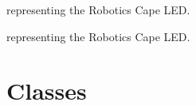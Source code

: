 \documentclass[letterpaper,10pt,english]{sphinxmanual}
\begin{document}

\begin{fulllineitems}
\label{\detokenize{index:rcpy.led.red}}
{\hyperref[\detokenize{index:rcpy.led.LED}]{}} representing the Robotics Cape  LED.

\end{fulllineitems}


\begin{fulllineitems}
\label{\detokenize{index:rcpy.led.green}}
{\hyperref[\detokenize{index:rcpy.led.LED}]{}} representing the Robotics Cape  LED.

\end{fulllineitems}



\section{Classes}
\label{\detokenize{index:id6}}
\end{document}
